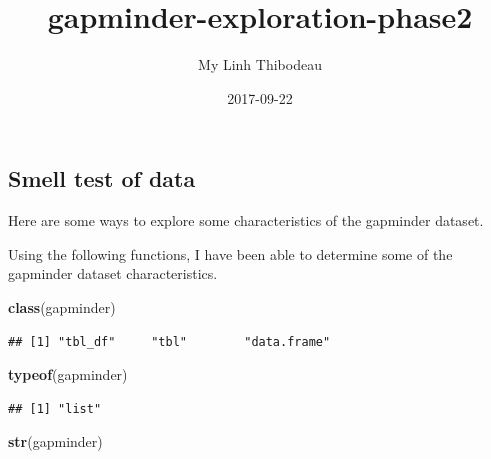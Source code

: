 \documentclass[]{article}
\title{gapminder-exploration-phase2}
\author{My Linh Thibodeau}
\date{2017-09-22}
\newenvironment{Shaded}{\begin{snugshade}}{\end{snugshade}}
\newcommand{\KeywordTok}[1]{\textcolor[rgb]{0.13,0.29,0.53}{\textbf{{#1}}}}
\newcommand{\DataTypeTok}[1]{\textcolor[rgb]{0.13,0.29,0.53}{{#1}}}
\newcommand{\DecValTok}[1]{\textcolor[rgb]{0.00,0.00,0.81}{{#1}}}
\newcommand{\CommentTok}[1]{\textcolor[rgb]{0.56,0.35,0.01}{\textit{{#1}}}}
\newcommand{\NormalTok}[1]{{#1}}
\begin{document}
\maketitle

\begin{Shaded}
\end{Shaded}

\subsection{Smell test of data}\label{smell-test-of-data}

Here are some ways to explore some characteristics of the gapminder
dataset.

Using the following functions, I have been able to determine some of the
gapminder dataset characteristics.

\begin{Shaded}
\begin{Highlighting}[]
\KeywordTok{class}\NormalTok{(gapminder)}
\end{Highlighting}
\end{Shaded}

\begin{verbatim}
## [1] "tbl_df"     "tbl"        "data.frame"
\end{verbatim}

\begin{Shaded}
\begin{Highlighting}[]
\KeywordTok{typeof}\NormalTok{(gapminder)}
\end{Highlighting}
\end{Shaded}

\begin{verbatim}
## [1] "list"
\end{verbatim}

\begin{Shaded}
\begin{Highlighting}[]
\KeywordTok{str}\NormalTok{(gapminder)}
\end{Highlighting}
\end{Shaded}
\end{document}
